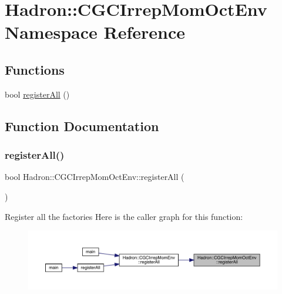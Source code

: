 \hypertarget{namespaceHadron_1_1CGCIrrepMomOctEnv}{}\section{Hadron\+:\+:C\+G\+C\+Irrep\+Mom\+Oct\+Env Namespace Reference}
\label{namespaceHadron_1_1CGCIrrepMomOctEnv}
\subsection*{Functions}
\begin{DoxyCompactItemize}
\item 
bool \mbox{\hyperlink{namespaceHadron_1_1CGCIrrepMomOctEnv_ac421d6769dc91c9ccc748ebbba3d108e}{register\+All}} ()
\end{DoxyCompactItemize}


\subsection{Function Documentation}
\mbox{\label{namespaceHadron_1_1CGCIrrepMomOctEnv_ac421d6769dc91c9ccc748ebbba3d108e}} 
\subsubsection{\texorpdfstring{registerAll()}{registerAll()}}
{\footnotesize\ttfamily bool Hadron\+::\+C\+G\+C\+Irrep\+Mom\+Oct\+Env\+::register\+All (\begin{DoxyParamCaption}{ }\end{DoxyParamCaption})}

Register all the factories Here is the caller graph for this function\+:\nopagebreak
\begin{figure}[H]
\begin{center}
\leavevmode
\includegraphics[width=350pt]{d8/d19/namespaceHadron_1_1CGCIrrepMomOctEnv_ac421d6769dc91c9ccc748ebbba3d108e_icgraph}
\end{center}
\end{figure}
